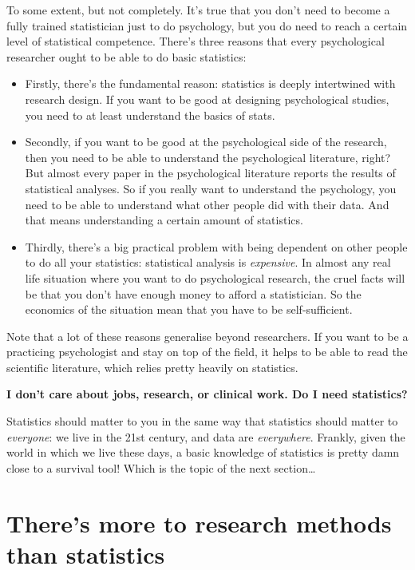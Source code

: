 \documentclass[
  11pt,
  a4paper,
  twoside,symmetric,openright]{book}
\providecommand{\tightlist}{%
  \setlength{\itemsep}{0pt}\setlength{\parskip}{0pt}}
\theoremstyle{break}
\theoremstyle{break}
\begin{document}
\nopagebreak[4]

To some extent, but not completely. It's true that you don't need to become a fully trained statistician just to do psychology, but you do need to reach a certain level of statistical competence. There's three reasons that every psychological researcher ought to be able to do basic statistics:

\begin{itemize}
\tightlist
\item
  Firstly, there's the fundamental reason: statistics is deeply intertwined with research design. If you want to be good at designing psychological studies, you need to at least understand the basics of stats.
\item
  Secondly, if you want to be good at the psychological side of the research, then you need to be able to understand the psychological literature, right? But almost every paper in the psychological literature reports the results of statistical analyses. So if you really want to understand the psychology, you need to be able to understand what other people did with their data. And that means understanding a certain amount of statistics.
\item
  Thirdly, there's a big practical problem with being dependent on other people to do all your statistics: statistical analysis is \emph{expensive}. In almost any real life situation where you want to do psychological research, the cruel facts will be that you don't have enough money to afford a statistician. So the economics of the situation mean that you have to be self-sufficient.
\end{itemize}

Note that a lot of these reasons generalise beyond researchers. If you want to be a practicing psychologist and stay on top of the field, it helps to be able to read the scientific literature, which relies pretty heavily on statistics.

\textbf{I don't care about jobs, research, or clinical work. Do I need statistics?}

\nopagebreak[4]

Statistics should matter to you in the same way that statistics should matter to \emph{everyone}: we live in the 21st century, and data are \emph{everywhere}. Frankly, given the world in which we live these days, a basic knowledge of statistics is pretty damn close to a survival tool! Which is the topic of the next section\ldots{}

\section{There's more to research methods than statistics}\label{theres-more-to-research-methods-than-statistics}
\end{document}
